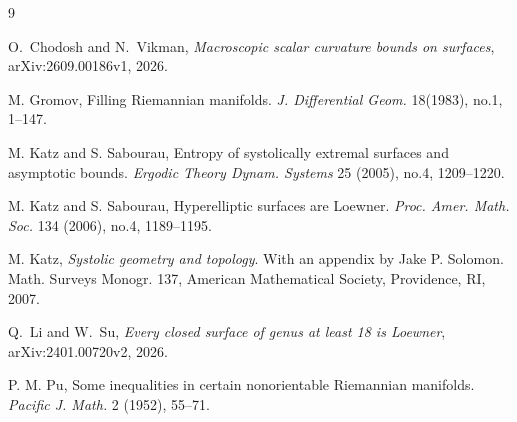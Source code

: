 \documentclass[11pt]{amsart}
\theoremstyle{remark}
\begin{document}

%
\begin{thebibliography}{9}

O.~Chodosh and N.~Vikman,
\emph{Macroscopic scalar curvature bounds on surfaces},
arXiv:2609.00186v1, 2026.

 M. Gromov, 
Filling Riemannian manifolds. \emph{J. Differential Geom.} 18(1983), no.1, 1--147.

 M. Katz and S. Sabourau, 
Entropy of systolically extremal surfaces and asymptotic bounds. \emph{Ergodic Theory Dynam. Systems} 25 (2005), no.4, 1209--1220.

 M. Katz and S. Sabourau, Hyperelliptic surfaces are Loewner. \emph{Proc. Amer. Math. Soc.} 134 (2006), no.4, 1189--1195.
    
 M. Katz, 
\emph{Systolic geometry and topology}.
With an appendix by Jake P. Solomon.
Math. Surveys Monogr. 137, 
American Mathematical Society, Providence, RI, 2007. 

Q.~Li and W.~Su,
\emph{Every closed surface of genus at least 18 is Loewner},
arXiv:2401.00720v2, 2026.

 P. M. Pu, Some inequalities in certain nonorientable Riemannian manifolds. \emph{Pacific J. Math.} 2 (1952), 55--71. 


\end{thebibliography}
\end{document}

